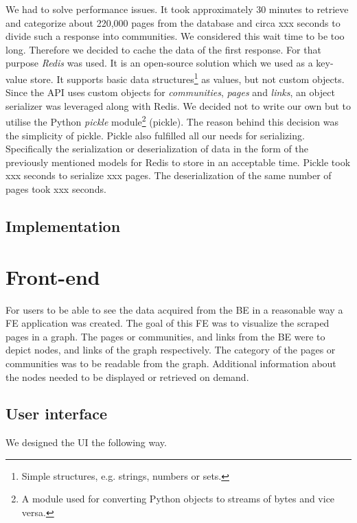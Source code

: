 We had to solve performance issues. It took approximately 30 minutes to retrieve and categorize about 220,000 pages from the database and circa xxx seconds to divide such a response into communities. We considered this wait time to be too long. Therefore we decided to cache the data of the first response. For that purpose \textit{Redis} \cite{redis} was used. It is an open-source solution which we used as a key-value store. It supports basic data structures\footnote{Simple structures, e.g. strings, numbers or sets.} as values, but not custom objects. Since the API uses custom objects for \textit{communities}, \textit{pages} and \textit{links}, an object serializer was leveraged along with Redis. We decided not to write our own but to utilise the Python \textit{pickle} module\footnote{A module used for converting Python objects to streams of bytes and vice versa.} \cite{pickle} (pickle). The reason behind this decision was the simplicity of pickle. Pickle also fulfilled all our needs for serializing. Specifically the serialization or deserialization of data in the form of the previously mentioned models for Redis to store in an acceptable time. Pickle took xxx seconds to serialize xxx pages. The deserialization of the same number of pages took xxx seconds.

\subsection{Implementation} \label{APIImplementation}


\section{Front-end}
For users to be able to see the data acquired from the BE in a reasonable way a FE application was created. The goal of this FE was to visualize the scraped pages in a graph. The pages or communities, and links from the BE were to depict nodes, and links of the graph respectively. The category of the pages or communities was to be readable from the graph. Additional information about the nodes needed to be displayed or retrieved on demand.

\subsection{User interface}
We designed the UI the following way. 

